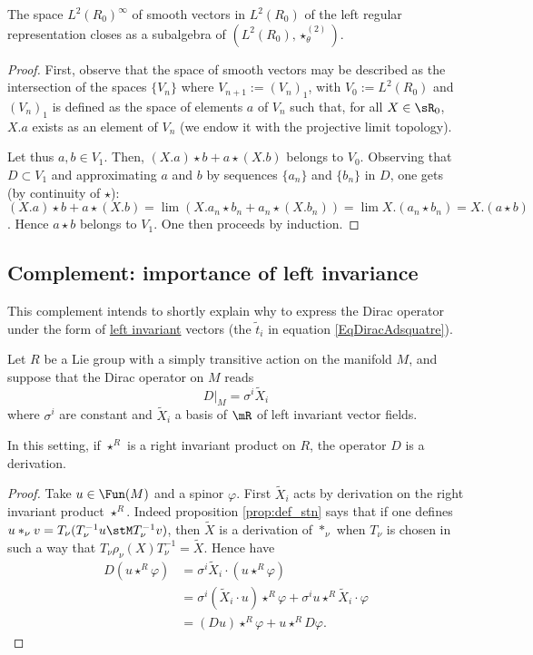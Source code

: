 \begin{proposition}
The space $L^2(R_0)^{\infty}$ of smooth vectors in $L^2(R_0)$ of the left regular representation closes as a subalgebra of $(L^2(R_0),\star^{(2)}_\theta)$.
\end{proposition}

\begin{proof}
First, observe that the space of smooth vectors may be described  as the intersection of the spaces $\{V_n\}$ where  $V_{n+1}:=(V_n)_1$,   with $V_0:=L^2(R_0)$ and $(V_n)_1$ is defined as the space of elements $a$ of $V_n$ such that, for all $X\in\sR_0$, $X.a$ exists as an element of $V_n$ (we endow it with the projective limit topology).                             %

Let thus $a,b\in V_1$. Then, $(X.a)\star b+a\star(X.b)$ belongs to $V_0$.  Observing that $D \subset V_1$ and approximating $a$ and $b$ by sequences $\{a_n\}$ and $\{b_n\}$ in $D $, one gets (by continuity of $\star$): $(X.a)\star b+a\star(X.b)=\lim(X.a_n\star b_n+a_n\star(X.b_n))= \lim X.(a_n\star b_n)=X.(a\star b)$. Hence $a\star b$ belongs to $V_1$.  One then proceeds by induction.
\end{proof}

\subsection{Complement: importance of left invariance}
\label{subsecImpLeftInvarDstar}

This complement intends to shortly explain why to express the Dirac operator under the form of \hyperlink{HyperDefLeftInvar}{left invariant} vectors (the $\tilde t_i$ in equation \eqref{EqDiracAdsquatre}).

Let $R$ be a Lie group with a simply transitive action on the manifold $M$, and suppose that the Dirac operator on $M$ reads
\[ 
  D|_M=\sigma^i\tilde X_i
\]
where $\sigma^i$ are constant and $\tilde X_i$ a basis of $\mR$ of left invariant vector fields.

\begin{proposition}
In this setting, if $\star^R$ is a right invariant product on $R$, the operator $D$ is a derivation. 
\end{proposition}

\begin{proof}
    Take $u\in\Fun(M)$ and a spinor $\varphi$. First $\tilde X_i$ acts by derivation on the right invariant product $\star^R$. Indeed proposition \ref{prop:def_stn} says that if one defines $u\ast_{\nu} v=T_{\nu}(T_{\nu}^{-1}u\stM T_{\nu}^{-1}v)$, then $\tilde X$ is a derivation of $\ast_{\nu}$ when $T_{\nu}$ is chosen in such a way that $T_{\nu}\rho_{\nu}(X)T_{\nu}^{-1}=\tilde X$. Hence have
\[ 
\begin{split}
D(u\star^R\varphi)&=\sigma^i\tilde X_i\cdot(u\star^R\varphi)\\
        &=\sigma^i(\tilde X_i\cdot u)\star^R\varphi+\sigma^i u\star^R\tilde X_i\cdot \varphi\\
        &=(Du)\star^R\varphi+u\star^R D\varphi.
\end{split}  
\]

\end{proof}

